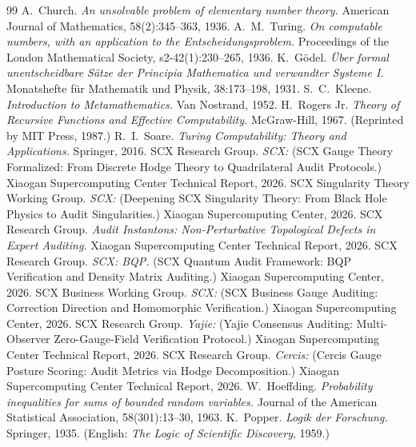 \documentclass[12pt,a4paper]{article}
\theoremstyle{plain}
\theoremstyle{definition}
\theoremstyle{remark}
\begin{document}
\begin{thebibliography}{99}
A.~Church.
\textit{An unsolvable problem of elementary number theory.}
American Journal of Mathematics, 58(2):345--363, 1936.
A.~M.~Turing.
\textit{On computable numbers, with an application to the Entscheidungsproblem.}
Proceedings of the London Mathematical Society, s2-42(1):230--265, 1936.
K.~G\"odel.
\textit{\"Uber formal unentscheidbare S\"atze der Principia Mathematica und verwandter Systeme I.}
Monatshefte f\"ur Mathematik und Physik, 38:173--198, 1931.
S.~C.~Kleene.
\textit{Introduction to Metamathematics.}
Van Nostrand, 1952.
H.~Rogers Jr.
\textit{Theory of Recursive Functions and Effective Computability.}
McGraw-Hill, 1967. (Reprinted by MIT Press, 1987.)
R.~I.~Soare.
\textit{Turing Computability: Theory and Applications.}
Springer, 2016.
SCX Research Group.
\textit{SCX:}
(SCX Gauge Theory Formalized: From Discrete Hodge Theory to Quadrilateral Audit Protocols.)
Xiaogan Supercomputing Center Technical Report, 2026.
SCX Singularity Theory Working Group.
\textit{SCX:}
(Deepening SCX Singularity Theory: From Black Hole Physics to Audit Singularities.)
Xiaogan Supercomputing Center, 2026.
SCX Research Group.
\textit{Audit Instantons: Non-Perturbative Topological Defects in Expert Auditing.}
Xiaogan Supercomputing Center Technical Report, 2026.
SCX Research Group.
\textit{SCX: BQP.}
(SCX Quantum Audit Framework: BQP Verification and Density Matrix Auditing.)
Xiaogan Supercomputing Center, 2026.
SCX Business Working Group.
\textit{SCX:}
(SCX Business Gauge Auditing: Correction Direction and Homomorphic Verification.)
Xiaogan Supercomputing Center, 2026.
SCX Research Group.
\textit{Yajie:}
(Yajie Consensus Auditing: Multi-Observer Zero-Gauge-Field Verification Protocol.)
Xiaogan Supercomputing Center Technical Report, 2026.
SCX Research Group.
\textit{Cercis:}
(Cercis Gauge Posture Scoring: Audit Metrics via Hodge Decomposition.)
Xiaogan Supercomputing Center Technical Report, 2026.
W.~Hoeffding.
\textit{Probability inequalities for sums of bounded random variables.}
Journal of the American Statistical Association, 58(301):13--30, 1963.
K.~Popper.
\textit{Logik der Forschung.}
Springer, 1935. (English: \textit{The Logic of Scientific Discovery}, 1959.)

\end{thebibliography}
\end{document}
